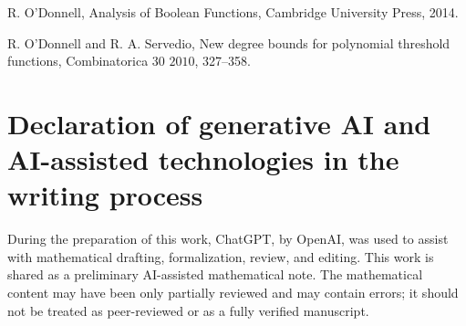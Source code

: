 \documentclass[11pt]{article}
\theoremstyle{definition}
\begin{document}
R. O'Donnell, Analysis of Boolean Functions, Cambridge University Press, 2014.

R. O'Donnell and R. A. Servedio, New degree bounds for polynomial threshold functions, Combinatorica 30 $2010$, 327--358.


\section*{Declaration of generative AI and AI-assisted technologies in the writing process}
During the preparation of this work, ChatGPT, by OpenAI, was used to assist with mathematical drafting, formalization, review, and editing. This work is shared as a preliminary AI-assisted mathematical note. The mathematical content may have been only partially reviewed and may contain errors; it should not be treated as peer-reviewed or as a fully verified manuscript.
\end{document}
